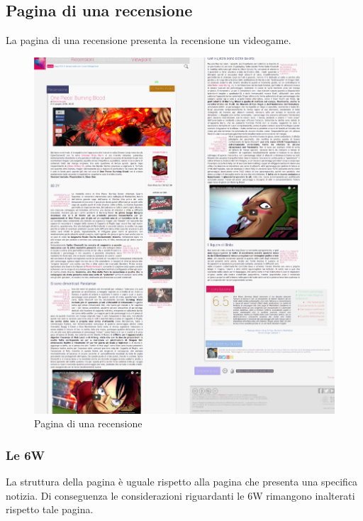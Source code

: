 \documentclass[../ProgettoTecWeb2.tex]{subfiles}
\begin{document}
	\subsection{Pagina di una recensione}
	La pagina di una recensione presenta la recensione un videogame.
	\begin{figure} [H]
			\centering
			\includegraphics[scale=0.15]{img/RecensioneSingolaCompleta}
			\caption{Pagina di una recensione}
	\end{figure}
		\subsubsection{Le 6W}
		La struttura della pagina è uguale rispetto alla pagina che presenta una specifica notizia. Di conseguenza le considerazioni riguardanti le 6W rimangono inalterati rispetto tale pagina.
\end{document}
